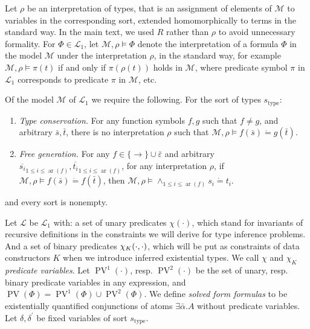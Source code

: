 \documentclass{article}
\newcommand{\cdummy}{\cdot}
\newcommand{\tmem}[1]{{\em #1\/}}
\newcommand{\tmop}[1]{\ensuremath{\operatorname{#1}}}
\begin{document}
Let $\rho$ be an interpretation of types, that is an assignment of elements of
$\mathcal{M}$ to variables in the corresponding sort, extended homomorphically
to terms in the standard way. In the main text, we used $R$ rather than $\rho$
to avoid unnecessary formality. For $\Phi \in \mathcal{L}_1$, let
$\mathcal{M}, \rho \vDash \Phi$ denote the interpretation of a formula $\Phi$
in the model $\mathcal{M}$ under the interpretation $\rho$, in the standard
way, for example $\mathcal{M}, \rho \vDash \pi (t)$ if and only if $\pi (\rho
(t))$ holds in $\mathcal{M}$, where predicate symbol $\pi$ in $\mathcal{L}_1$
corresponds to predicate $\pi$ in $\mathcal{M}$, etc.

Of the model $\mathcal{M}$ of $\mathcal{L}_1$ we require the following. For
the sort of types $s_{\tmop{type}}$:
\begin{enumerate}
  \item {\tmem{Type conservation.}} For any function symbols $f, g$ such that
  $f \neq g$, and arbitrary $\bar{s}, \bar{t}$, there is no interpretation
  $\rho$ such that $\mathcal{M}, \rho \vDash f (\bar{s}) \dot{=} g (\bar{t})$.
  
  \item {\tmem{Free generation.}} For any $f \in \{\rightarrow\} \cup
  \bar{\varepsilon}$ and arbitrary $\overline{s_i}_{1 \leqslant i \leqslant
  \tmop{ar} (f)}, \overline{t_i}_{1 \leqslant i \leqslant \tmop{ar} (f)}$, for
  any interpretation $\rho$, if $\mathcal{M}, \rho \vDash f (\bar{s}) \dot{=}
  f (\bar{t})$, then $\mathcal{M}, \rho \vDash \wedge_{1 \leqslant i \leqslant
  \tmop{ar} (f)} s_i \dot{=} t_i$.
\end{enumerate}
and every sort is nonempty.

Let $\mathcal{L}$ be $\mathcal{L}_1$ with: a set of unary predicates $\chi
(\cdummy)$, which stand for invariants of recursive definitions in the
constraints we will derive for type inference problems. And a set of binary
predicates $\chi_K (\cdummy, {\nobreak} \cdot)$, which will be put as
constraints of data constructors $K$ when we introduce inferred existential
types. We call $\chi$ and $\chi_K$ {\tmem{predicate variables}}. Let
$\tmop{PV}^1 (\cdummy)$, resp. $\tmop{PV}^2 (\cdummy)$ be the set of unary,
resp. binary predicate variables in any expression, and $\tmop{PV} (\Phi) =
\tmop{PV}^1 (\Phi) \cup \tmop{PV}^2 (\Phi)$. We define {\tmem{solved form
formulas}} to be existentially quantified conjunctions of atoms $\exists
\bar{\alpha} .A$ without predicate variables. Let $\delta, \delta^{\prime}$ be
fixed variables of sort $s_{\tmop{type}}$.
\end{document}
